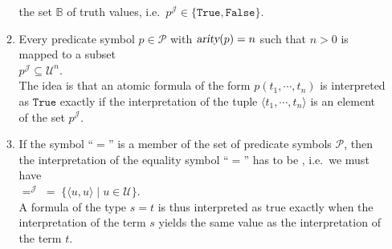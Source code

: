 \begin{Definition}[Structure]
\begin{enumerate}
\begin{enumerate}
              the set $\mathbb{B}$ of truth values, i.e.~$p^{\mathcal{J}} \in \{ \mathtt{True}, \mathtt{False}\}$.
        \item Every predicate symbol $p \in \mathcal{P}$ with $\textsl{arity}(p) = n$ such that $n > 0$ is mapped to
              a subset \\[0.2cm]
              \hspace*{1.3cm} 
              $p^\mathcal{J} \subseteq \mathcal{U}^n$. \\[0.2cm]
              The idea is that an atomic formula of the form $p(t_1, \cdots, t_n)$
              is interpreted as $\texttt{True}$ exactly if the interpretation of the tuple
              $\langle t_1, \cdots, t_n \rangle$ is an element of the set $p^\mathcal{J}$.
        \item If the symbol ``$=$'' is a member of the set of predicate symbols $\mathcal{P}$, then the
              interpretation of  the equality symbol ``$=$'' has to be , i.e.~we must have
              \\[0.2cm]
              \hspace*{1.3cm}  
              $=^\mathcal{J} \;=\; \bigl\{ \langle u, u \rangle \mid u \in \mathcal{U} \bigr\}$.
              \\[0.2cm]
              A formula of the type $s = t$ is thus interpreted as true 
              exactly when the interpretation of the term $s$ yields the same value as the interpretation of
              the term $t$. 
              \eox
        \end{enumerate}
    \end{enumerate}
\end{Definition}

